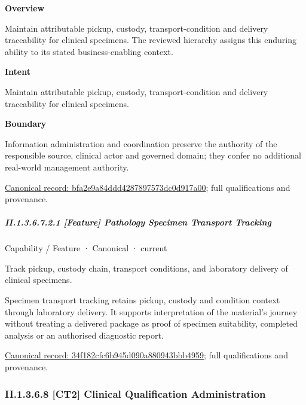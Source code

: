 \textbf{Overview}



Maintain attributable pickup, custody, transport-condition and delivery traceability for clinical specimens. The reviewed hierarchy assigns this enduring ability to its stated business-enabling context.



\textbf{Intent}



Maintain attributable pickup, custody, transport-condition and delivery traceability for clinical specimens.



\textbf{Boundary}



Information administration and coordination preserve the authority of the responsible source, clinical actor and governed domain; they confer no additional real-world management authority.


{\footnotesize \href{../../../../continuum/strategy/capability/bfa2e9a84ddd4287897573dc0d917a00.md}{Canonical record: bfa2e9a84ddd4287897573dc0d917a00}; full qualifications and provenance.}\par
\subparagraph*{II.1.3.6.7.2.1 [Feature] Pathology Specimen Transport Tracking}
\label{navigation:II.1.3.6.7.2.1}

\label{element:34f182cfc6b945d090a880943bbb4959}
{\small Capability / Feature · Canonical · current}\par

Track pickup, custody chain, transport conditions, and laboratory delivery of clinical specimens.



Specimen transport tracking retains pickup, custody and condition context through laboratory delivery. It supports interpretation of the material's journey without treating a delivered package as proof of specimen suitability, completed analysis or an authorised diagnostic report.


{\footnotesize \href{../../../../continuum/strategy/capability/feature/34f182cfc6b945d090a880943bbb4959.md}{Canonical record: 34f182cfc6b945d090a880943bbb4959}; full qualifications and provenance.}\par
\subsubsection*{II.1.3.6.8 [CT2] Clinical Qualification Administration}
\label{navigation:II.1.3.6.8}


